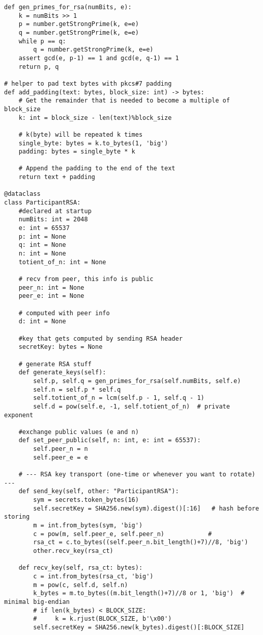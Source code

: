 \documentclass[11pt]{article}
\begin{document}
\begin{lstlisting}
def gen_primes_for_rsa(numBits, e):
    k = numBits >> 1
    p = number.getStrongPrime(k, e=e)
    q = number.getStrongPrime(k, e=e)
    while p == q:
        q = number.getStrongPrime(k, e=e)
    assert gcd(e, p-1) == 1 and gcd(e, q-1) == 1
    return p, q

# helper to pad text bytes with pkcs#7 padding
def add_padding(text: bytes, block_size: int) -> bytes:
    # Get the remainder that is needed to become a multiple of block_size
    k: int = block_size - len(text)%block_size

    # k(byte) will be repeated k times
    single_byte: bytes = k.to_bytes(1, 'big')
    padding: bytes = single_byte * k

    # Append the padding to the end of the text 
    return text + padding 

@dataclass
class ParticipantRSA:
    #declared at startup
    numBits: int = 2048
    e: int = 65537
    p: int = None
    q: int = None
    n: int = None
    totient_of_n: int = None

    # recv from peer, this info is public
    peer_n: int = None
    peer_e: int = None

    # computed with peer info
    d: int = None

    #key that gets computed by sending RSA header
    secretKey: bytes = None

    # generate RSA stuff
    def generate_keys(self): 
        self.p, self.q = gen_primes_for_rsa(self.numBits, self.e)
        self.n = self.p * self.q
        self.totient_of_n = lcm(self.p - 1, self.q - 1)
        self.d = pow(self.e, -1, self.totient_of_n)  # private exponent
    
    #exchange public values (e and n)
    def set_peer_public(self, n: int, e: int = 65537):
        self.peer_n = n
        self.peer_e = e

    # --- RSA key transport (one-time or whenever you want to rotate) ---
    def send_key(self, other: "ParticipantRSA"):
        sym = secrets.token_bytes(16)
        self.secretKey = SHA256.new(sym).digest()[:16]   # hash before storing
        m = int.from_bytes(sym, 'big')
        c = pow(m, self.peer_e, self.peer_n)            #
        rsa_ct = c.to_bytes((self.peer_n.bit_length()+7)//8, 'big')
        other.recv_key(rsa_ct)

    def recv_key(self, rsa_ct: bytes):
        c = int.from_bytes(rsa_ct, 'big')
        m = pow(c, self.d, self.n)
        k_bytes = m.to_bytes((m.bit_length()+7)//8 or 1, 'big')  # minimal big-endian
        # if len(k_bytes) < BLOCK_SIZE:
        #     k = k.rjust(BLOCK_SIZE, b'\x00')
        self.secretKey = SHA256.new(k_bytes).digest()[:BLOCK_SIZE] 


\end{lstlisting}
\end{document}
